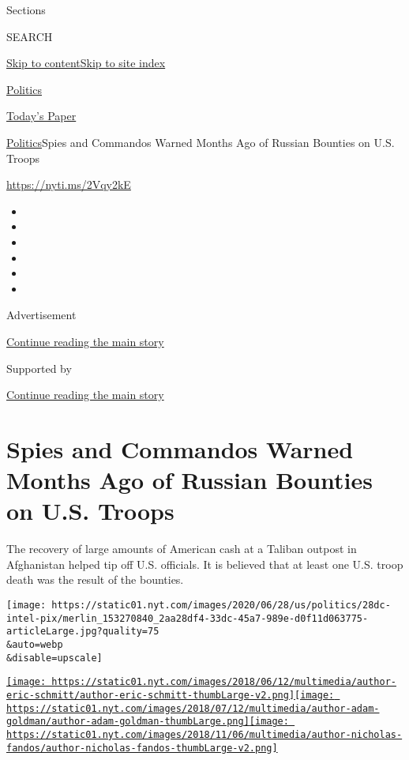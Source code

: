 Sections

SEARCH

\protect\hyperlink{site-content}{Skip to
content}\protect\hyperlink{site-index}{Skip to site index}

\href{https://www.nytimes.com/section/politics}{Politics}

\href{https://myaccount.nytimes.com/auth/login?response_type=cookie\&client_id=vi}{}

\href{https://www.nytimes.com/section/todayspaper}{Today's Paper}

\href{/section/politics}{Politics}\textbar{}Spies and Commandos Warned
Months Ago of Russian Bounties on U.S. Troops

\url{https://nyti.ms/2Vqy2kE}

\begin{itemize}
\item
\item
\item
\item
\item
\item
\end{itemize}

Advertisement

\protect\hyperlink{after-top}{Continue reading the main story}

Supported by

\protect\hyperlink{after-sponsor}{Continue reading the main story}

\hypertarget{spies-and-commandos-warned-months-ago-of-russian-bounties-on-us-troops}{%
\section{Spies and Commandos Warned Months Ago of Russian Bounties on
U.S.
Troops}\label{spies-and-commandos-warned-months-ago-of-russian-bounties-on-us-troops}}

The recovery of large amounts of American cash at a Taliban outpost in
Afghanistan helped tip off U.S. officials. It is believed that at least
one U.S. troop death was the result of the bounties.

\texttt{[image: https://static01.nyt.com/images/2020/06/28/us/politics/28dc-intel-pix/merlin\_153270840\_2aa28df4-33dc-45a7-989e-d0f11d063775-articleLarge.jpg?quality=75\\\&auto=webp\\\&disable=upscale]}

\href{https://www.nytimes.com/by/eric-schmitt}{\texttt{[image: https://static01.nyt.com/images/2018/06/12/multimedia/author-eric-schmitt/author-eric-schmitt-thumbLarge-v2.png]}}\href{https://www.nytimes.com/by/adam-goldman}{\texttt{[image: https://static01.nyt.com/images/2018/07/12/multimedia/author-adam-goldman/author-adam-goldman-thumbLarge.png]}}\href{https://www.nytimes.com/by/nicholas-fandos}{\texttt{[image: https://static01.nyt.com/images/2018/11/06/multimedia/author-nicholas-fandos/author-nicholas-fandos-thumbLarge-v2.png]}}


